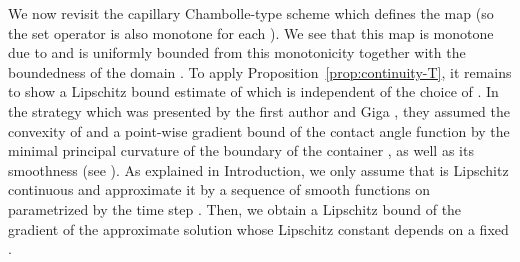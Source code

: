 \documentclass[11pt]{article}
\makeatletter
\numberwithin{equation}{section}
\newcommand{\pOmega}[0]{\partial\Omega}
\newcounter{mathrecordid}
\newcommand{\mathboxbegin}[1]{%
  \stepcounter{mathrecordid}%
  \immediate\write\mathrecords{\themathrecordid,#1}%
  \special{pdf:bann << /Type /Annot /Subtype /Link /Border [0 0 0]
    /MathBoxID \themathrecordid /F 2
    /A << /S /URI /URI (urn:mathbox:\themathrecordid) >> >>}}
\newcommand{\mathboxinlineplain}[1]{$#1$}
\newcommand{\mathboxinline}[1]{%
  $\mathboxbegin{inline}%
  \special{pdf:literal direct /MathBoxBegin\themathrecordid\space MP}%
  #1\special{pdf:literal direct /MathBoxEnd\themathrecordid\space MP}%
  \special{pdf:eann}$}
\newcommand{\recordmath}{%
  \ifmeasuring@\expandafter\mathboxinlineplain
  \else\expandafter\mathboxinline\fi}
\makeatother
\begin{document}
We now revisit the capillary Chambolle-type scheme which defines the map \recordmath{E\mapsto w_E^h} (so the set operator \recordmath{T_h} is also monotone for each \recordmath{h>0}).
We see that this map is monotone due to \cite[Lemma 3.1]{EG25} and is uniformly bounded from this monotonicity together with the boundedness of the domain \recordmath{\Omega}.
To apply Proposition~\ref{prop:continuity-T}, it remains to show a Lipschitz bound estimate of \recordmath{w_E} which is independent of the choice of \recordmath{E}.
In the strategy which was presented by the first author and Giga \cite{EG25}, they assumed the convexity of \recordmath{\Omega}
and a point-wise gradient bound of the contact angle function \recordmath{\beta} by the minimal principal curvature of the boundary of 
the container \recordmath{\pOmega}, as well as its smoothness (see \cite[Theorem 3.1]{EG25}).
As explained in Introduction, we only assume that \recordmath{\beta} is Lipschitz continuous and approximate it by a sequence \recordmath{\{\beta^h\}_{h>0}} of smooth functions on \recordmath{\pOmega} parametrized by the time step \recordmath{h>0}. Then, we obtain a Lipschitz bound of the gradient of the approximate solution whose Lipschitz constant depends on a fixed \recordmath{h>0}.
\end{document}
